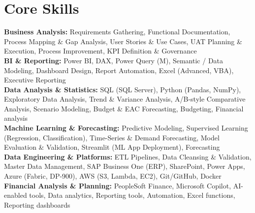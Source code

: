 \documentclass[10.5pt,letterpaper]{article}
\begin{document}
\section{Core Skills}
\noindent
\textbf{Business Analysis:} Requirements Gathering, Functional Documentation, Process Mapping \& Gap Analysis, User Stories \& Use Cases, UAT Planning \& Execution, Process Improvement, KPI Definition \& Governance\\\textbf{BI \& Reporting:} Power BI, DAX, Power Query (M), Semantic / Data Modeling, Dashboard Design, Report Automation, Excel (Advanced, VBA), Executive Reporting\\\textbf{Data Analysis \& Statistics:} SQL (SQL Server), Python (Pandas, NumPy), Exploratory Data Analysis, Trend \& Variance Analysis, A/B-style Comparative Analysis, Scenario Modeling, Budget \& EAC Forecasting, Budgeting, Financial analysis\\\textbf{Machine Learning \& Forecasting:} Predictive Modeling, Supervised Learning (Regression, Classification), Time-Series \& Demand Forecasting, Model Evaluation \& Validation, Streamlit (ML App Deployment), Forecasting\\\textbf{Data Engineering \& Platforms:} ETL Pipelines, Data Cleansing \& Validation, Master Data Management, SAP Business One (ERP), SharePoint, Power Apps, Azure (Fabric, DP-900), AWS (S3, Lambda, EC2), Git/GitHub, Docker\\\textbf{Financial Analysis \& Planning:} PeopleSoft Finance, Microsoft Copilot, AI-enabled tools, Data analytics, Reporting tools, Automation, Excel functions, Reporting dashboards
\end{document}
